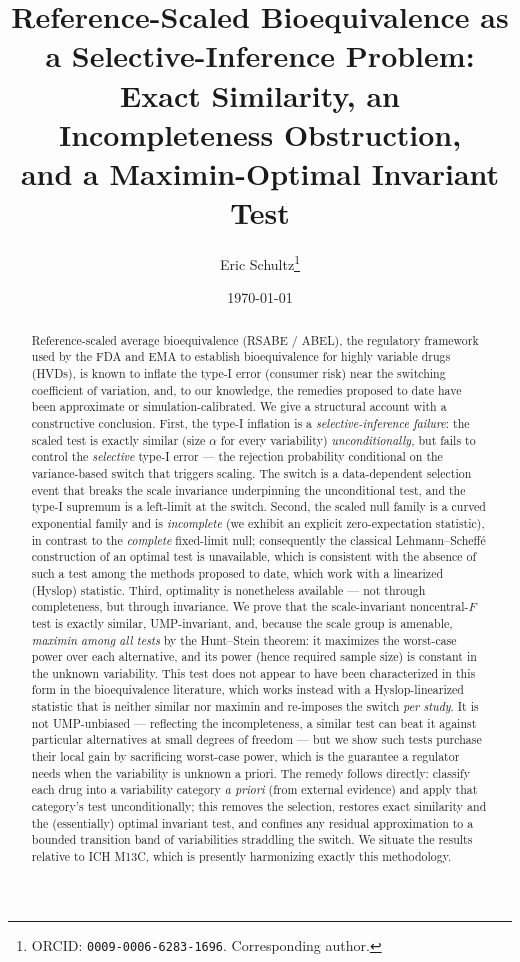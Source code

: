 \documentclass[11pt]{article}
\title{\bfseries Reference-Scaled Bioequivalence as a Selective-Inference Problem:\\
Exact Similarity, an Incompleteness Obstruction,\\ and a Maximin-Optimal Invariant Test}
\author[1]{Eric Schultz\thanks{ORCID: \texttt{0009-0006-6283-1696}. Corresponding author.}}
\affil[1]{Independent Researcher}
\date{\today}
\theoremstyle{remark}
\begin{document}
\maketitle

\begin{abstract}
Reference-scaled average bioequivalence (RSABE / ABEL), the regulatory framework used by the FDA and EMA to establish bioequivalence for highly variable drugs (HVDs), is known to inflate the type-I error (consumer risk) near the switching coefficient of variation, and, to our knowledge, the remedies proposed to date have been approximate or simulation-calibrated. We give a structural account with a constructive conclusion. First, the type-I inflation is a \emph{selective-inference failure}: the scaled test is exactly similar (size $\alpha$ for every variability) \emph{unconditionally}, but fails to control the \emph{selective} type-I error --- the rejection probability conditional on the variance-based switch that triggers scaling. The switch is a data-dependent selection event that breaks the scale invariance underpinning the unconditional test, and the type-I supremum is a left-limit at the switch. Second, the scaled null family is a curved exponential family and is \emph{incomplete} (we exhibit an explicit zero-expectation statistic), in contrast to the \emph{complete} fixed-limit null; consequently the classical Lehmann--Scheff\'e construction of an optimal test is unavailable, which is consistent with the absence of such a test among the methods proposed to date, which work with a linearized (Hyslop) statistic. Third, optimality is nonetheless available --- not through completeness, but through invariance. We prove that the scale-invariant noncentral-$F$ test is exactly similar, UMP-invariant, and, because the scale group is amenable, \emph{maximin among all tests} by the Hunt--Stein theorem: it maximizes the worst-case power over each alternative, and its power (hence required sample size) is constant in the unknown variability. This test does not appear to have been characterized in this form in the bioequivalence literature, which works instead with a Hyslop-linearized statistic that is neither similar nor maximin and re-imposes the switch \emph{per study}. It is not UMP-unbiased --- reflecting the incompleteness, a similar test can beat it against particular alternatives at small degrees of freedom --- but we show such tests purchase their local gain by sacrificing worst-case power, which is the guarantee a regulator needs when the variability is unknown a priori. The remedy follows directly: classify each drug into a variability category \emph{a priori} (from external evidence) and apply that category's test unconditionally; this removes the selection, restores exact similarity and the (essentially) optimal invariant test, and confines any residual approximation to a bounded transition band of variabilities straddling the switch. We situate the results relative to ICH M13C, which is presently harmonizing exactly this methodology.
\end{abstract}
\end{document}
